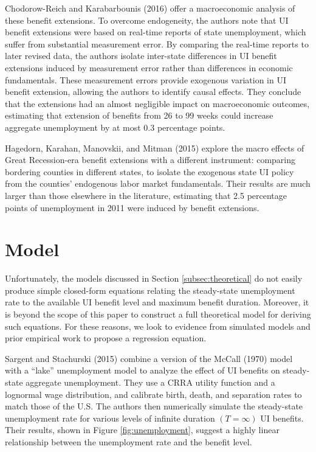 \documentclass[12pt]{article}
\begin{document}
Chodorow-Reich and Karabarbounis (2016) offer a macroeconomic analysis of these benefit extensions. To overcome endogeneity, the authors note that UI benefit extensions were based on real-time reports of state unemployment, which suffer from substantial measurement error. By comparing the real-time reports to later revised data, the authors isolate inter-state differences in UI benefit extensions induced by measurement error rather than differences in economic fundamentals. These measurement errors provide exogenous variation in UI benefit extension, allowing the authors to identify causal effects. They conclude that the extensions had an almost negligible impact on macroeconomic outcomes, estimating that extension of benefits from 26 to 99 weeks could increase aggregate unemployment by at most 0.3 percentage points.

Hagedorn, Karahan, Manovskii, and Mitman (2015) explore the macro effects of Great Recession-era benefit extensions with a different instrument: comparing bordering counties in different states, to isolate the exogenous state UI policy from the counties' endogenous labor market fundamentals. Their results are much larger than those elsewhere in the literature, estimating that 2.5 percentage points of unemployment in 2011 were induced by benefit extensions.


\section{Model \label{sec:model}}

Unfortunately, the models discussed in Section \ref{subsec:theoretical} do not easily produce simple closed-form equations relating the steady-state unemployment rate to the available UI benefit level and maximum benefit duration. Moreover, it is beyond the scope of this paper to construct a full theoretical model for deriving such equations. For these reasons, we look to evidence from simulated models and prior empirical work to propose a regression equation.

Sargent and Stachurski (2015) combine a version of the McCall (1970) model with a ``lake'' unemployment model to analyze the effect of UI benefits on steady-state aggregate unemployment. They use a CRRA utility function and a lognormal wage distribution, and calibrate birth, death, and separation rates to match those of the U.S. The authors then numerically simulate the steady-state unemployment rate for various levels of infinite duration $(T=\infty)$ UI benefits. Their results, shown in Figure \ref{fig:unemployment}, suggest a highly linear relationship between the unemployment rate and the benefit level.
\end{document}
